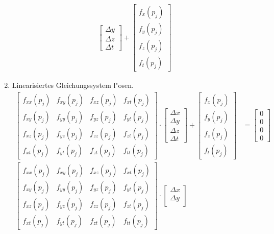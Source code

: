 \begin{refsection}
\begin{enumerate}
\begin{align*}
\begin{bmatrix}
\Delta y \\
\Delta z \\
\Delta t 
\end{bmatrix} +
\begin{bmatrix} 
f_x(p_j) \\
f_y(p_j) \\
f_z(p_j) \\
f_t(p_j) 
\end{bmatrix}
\end{align*}
\item Linearisiertes Gleichungssystem l"osen.\\[0.2cm]
\begin{align*}
\begin{bmatrix} 
f_{xx}(p_j) &  f_{xy}(p_j) & f_{xz}(p_j) & f_{xt}(p_j)\\
f_{xy}(p_j) & f_{yy}(p_j) & f_{yz}(p_j) & f_{yt}(p_j)\\
f_{xz}(p_j) & f_{yz}(p_j) & f_{zz}(p_j) & f_{zt}(p_j)\\
f_{xt}(p_j) & f_{yt}(p_j) & f_{zt}(p_j) & f_{tt}(p_j)
\end{bmatrix} \cdot
\begin{bmatrix} 
\Delta x \\
\Delta y \\
\Delta z \\
\Delta t 
\end{bmatrix} + \begin{bmatrix} 
f_x(p_j) \\
f_y(p_j) \\
f_z(p_j) \\
f_t(p_j) 
\end{bmatrix}&= \begin{bmatrix} 0 \\ 0 \\ 0 \\ 0 \end{bmatrix}
\\
\begin{bmatrix} 
f_{xx}(p_j) &  f_{xy}(p_j) & f_{xz}(p_j) & f_{xt}(p_j)\\
f_{xy}(p_j) & f_{yy}(p_j) & f_{yz}(p_j) & f_{yt}(p_j)\\
f_{xz}(p_j) & f_{yz}(p_j) & f_{zz}(p_j) & f_{zt}(p_j)\\
f_{xt}(p_j) & f_{yt}(p_j) & f_{zt}(p_j) & f_{tt}(p_j)
\end{bmatrix} \cdot \begin{bmatrix} 
\Delta x \\
\Delta y \\

\end{bmatrix}
\end{align*}
\end{enumerate}
\end{refsection}
